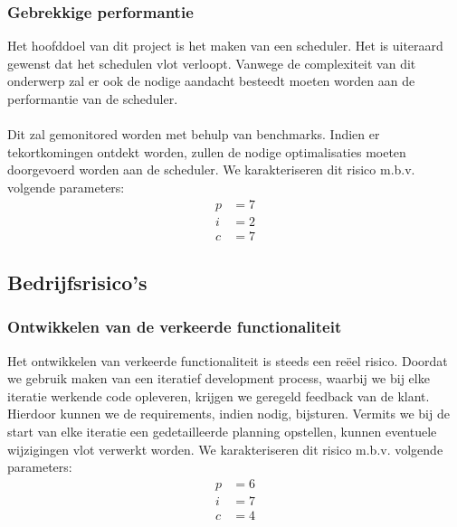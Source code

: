 \subsubsection{Gebrekkige performantie}
Het hoofddoel van dit project is het maken van een scheduler. Het is uiteraard gewenst dat het schedulen vlot verloopt. Vanwege de complexiteit van dit onderwerp zal er ook de nodige aandacht besteedt moeten worden aan de performantie van de scheduler.
\\
\\
Dit zal gemonitored worden met behulp van benchmarks. Indien er tekortkomingen ontdekt worden, zullen de nodige optimalisaties moeten doorgevoerd worden aan de scheduler. We karakteriseren dit risico m.b.v. volgende parameters:
\begin{align*}
	p &= 7\\
	i &= 2\\
	c &= 7
\end{align*}


\subsection{Bedrijfsrisico's}
\subsubsection{Ontwikkelen van de verkeerde functionaliteit}
Het ontwikkelen van verkeerde functionaliteit is steeds een re\"{e}el risico. Doordat we gebruik maken van een iteratief development process, waarbij we bij elke iteratie werkende code opleveren, krijgen we geregeld feedback van de klant. Hierdoor kunnen we de requirements, indien nodig, bijsturen. Vermits we bij de start van elke iteratie een gedetailleerde planning opstellen, kunnen eventuele wijzigingen vlot verwerkt worden. We karakteriseren dit risico m.b.v. volgende parameters:
\begin{align*}
	p &= 6\\
	i &= 7\\
	c &= 4
\end{align*}

